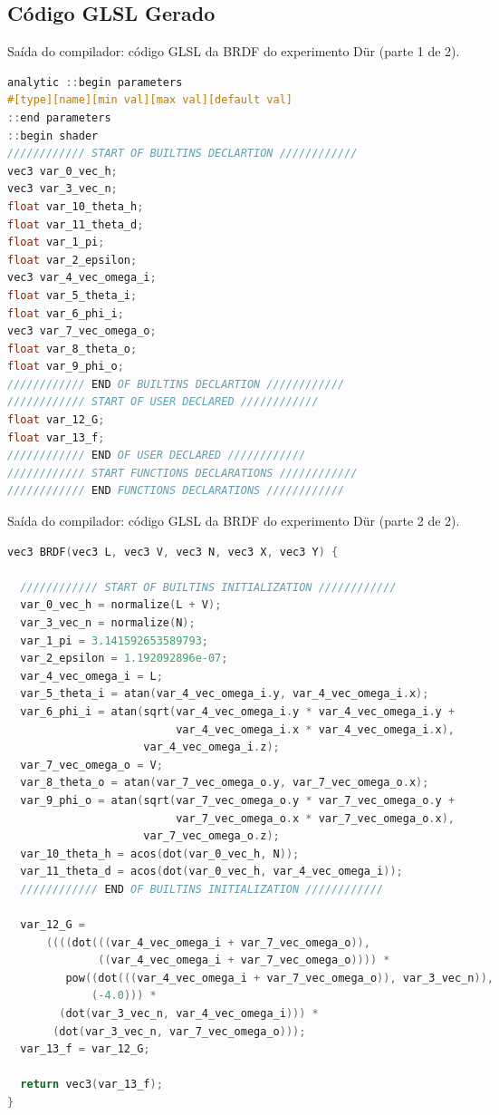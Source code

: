 \subsection{Código GLSL Gerado}
\begin{codigo}[H]
    \caption{\small Saída do compilador: código GLSL da BRDF do experimento Dür (parte 1 de 2).}
    \label{cod-duer-glsl-pt-1}
\begin{lstlisting}[language=C, inputencoding=utf8]
analytic ::begin parameters
#[type][name][min val][max val][default val]
::end parameters
::begin shader
//////////// START OF BUILTINS DECLARTION ////////////
vec3 var_0_vec_h;
vec3 var_3_vec_n;
float var_10_theta_h;
float var_11_theta_d;
float var_1_pi;
float var_2_epsilon;
vec3 var_4_vec_omega_i;
float var_5_theta_i;
float var_6_phi_i;
vec3 var_7_vec_omega_o;
float var_8_theta_o;
float var_9_phi_o;
//////////// END OF BUILTINS DECLARTION ////////////
//////////// START OF USER DECLARED ////////////
float var_12_G;
float var_13_f;
//////////// END OF USER DECLARED ////////////
//////////// START FUNCTIONS DECLARATIONS ////////////
//////////// END FUNCTIONS DECLARATIONS ////////////

\end{lstlisting}
\end{codigo}

\begin{codigo}[H]
    \caption{\small Saída do compilador: código GLSL da BRDF do experimento Dür (parte 2 de 2).}
    \label{cod-duer-glsl-pt-2}
\begin{lstlisting}[language=C, inputencoding=utf8]
vec3 BRDF(vec3 L, vec3 V, vec3 N, vec3 X, vec3 Y) {

  //////////// START OF BUILTINS INITIALIZATION ////////////
  var_0_vec_h = normalize(L + V);
  var_3_vec_n = normalize(N);
  var_1_pi = 3.141592653589793;
  var_2_epsilon = 1.192092896e-07;
  var_4_vec_omega_i = L;
  var_5_theta_i = atan(var_4_vec_omega_i.y, var_4_vec_omega_i.x);
  var_6_phi_i = atan(sqrt(var_4_vec_omega_i.y * var_4_vec_omega_i.y +
                          var_4_vec_omega_i.x * var_4_vec_omega_i.x),
                     var_4_vec_omega_i.z);
  var_7_vec_omega_o = V;
  var_8_theta_o = atan(var_7_vec_omega_o.y, var_7_vec_omega_o.x);
  var_9_phi_o = atan(sqrt(var_7_vec_omega_o.y * var_7_vec_omega_o.y +
                          var_7_vec_omega_o.x * var_7_vec_omega_o.x),
                     var_7_vec_omega_o.z);
  var_10_theta_h = acos(dot(var_0_vec_h, N));
  var_11_theta_d = acos(dot(var_0_vec_h, var_4_vec_omega_i));
  //////////// END OF BUILTINS INITIALIZATION ////////////

  var_12_G =
      ((((dot(((var_4_vec_omega_i + var_7_vec_omega_o)),
              ((var_4_vec_omega_i + var_7_vec_omega_o)))) *
         pow((dot(((var_4_vec_omega_i + var_7_vec_omega_o)), var_3_vec_n)),
             (-4.0))) *
        (dot(var_3_vec_n, var_4_vec_omega_i))) *
       (dot(var_3_vec_n, var_7_vec_omega_o)));
  var_13_f = var_12_G;

  return vec3(var_13_f);
}
\end{lstlisting}
\end{codigo}


